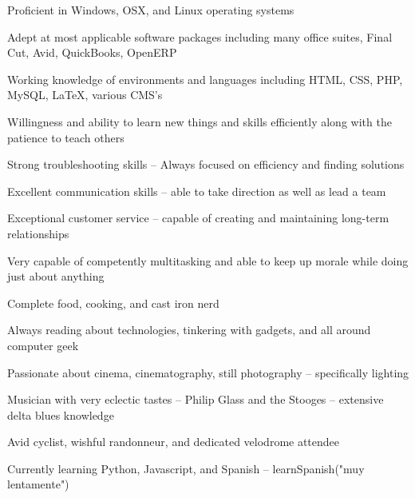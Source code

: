 \documentclass[10pt,letterpaper]{article}			%
\begin{document}
	\begin{itemize*}
	\item Proficient in Windows, OSX, and Linux operating systems
	\item Adept at most applicable software packages including many office suites, Final Cut, Avid, QuickBooks, OpenERP
	\item Working knowledge of environments and languages including HTML, CSS, PHP, MySQL, \LaTeX, various CMS's
	\item Willingness and ability to learn new things and skills efficiently along with the patience to teach others
	\item Strong troubleshooting skills -- Always focused on efficiency and finding solutions
	\item Excellent communication skills -- able to take direction as well as lead a team
	\item Exceptional customer service -- capable of creating and maintaining long-term relationships
	\item Very capable of competently multitasking and able to keep up morale while doing just about anything
	\item Complete food, cooking, and cast iron nerd
	\item Always reading about technologies, tinkering with gadgets, and all around computer geek
	\item Passionate about cinema, cinematography, still photography -- specifically lighting
	\item Musician with very eclectic tastes -- Philip Glass and the Stooges -- extensive delta blues knowledge
	\item Avid cyclist, wishful randonneur, and dedicated velodrome attendee
	\item Currently learning Python, Javascript, and Spanish -- learnSpanish("muy lentamente")
	\end{itemize*}
	
\vfill												%
\begin{comment}ho
\hrule
\vspace{0.8em}

Cameron Dershem
\hfill 312.361.0322
\hfill cldershem@gmail.com
\hfill \Location

\vspace{0.1em}
\hrule
\end{comment}
\end{document}
